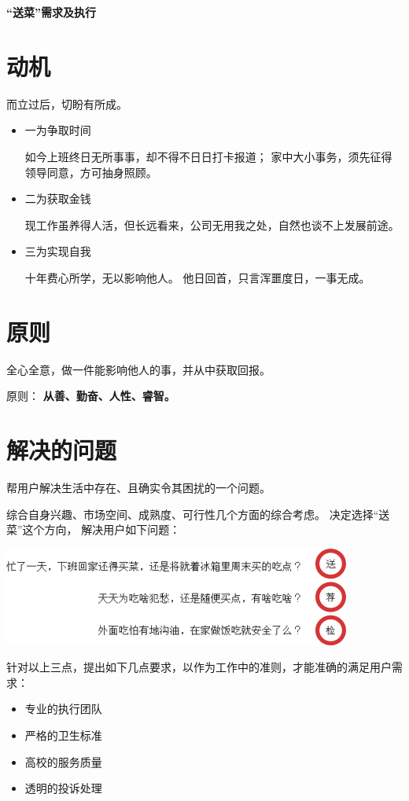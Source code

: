 \documentclass[a4paper,12pt]{article}
\begin{document}
  \begin{center}
    \huge \bf  “送菜”需求及执行
  \end{center}


  \section{动机}
  而立过后，切盼有所成。 \\
  \begin{itemize}
  \item 一为争取时间

    如今上班终日无所事事，却不得不日日打卡报道； 家中大小事务，须先征得领导同意，方可抽身照顾。

  \item 二为获取金钱

    现工作虽养得人活，但长远看来，公司无用我之处，自然也谈不上发展前途。

  \item 三为实现自我

    十年费心所学，无以影响他人。 他日回首，只言浑噩度日，一事无成。

  \end{itemize}


  \section{原则}
  全心全意，做一件能影响他人的事，并从中获取回报。

  原则： \textbf{从善、勤奋、人性、睿智。}
  


  \section{解决的问题}
  帮用户解决生活中存在、且确实令其困扰的一个问题。

  综合自身兴趣、市场空间、成熟度、可行性几个方面的综合考虑。 决定选择“送菜”这个方向，
  解决用户如下问题：
  \begin{center}
    \includegraphics{need.png}
  \end{center}

  针对以上三点，提出如下几点要求，以作为工作中的准则，才能准确的满足用户需求：
  \begin{itemize}
  \item 专业的执行团队
  \item 严格的卫生标准
  \item 高校的服务质量
  \item 透明的投诉处理
  \end{itemize}
\end{document}
